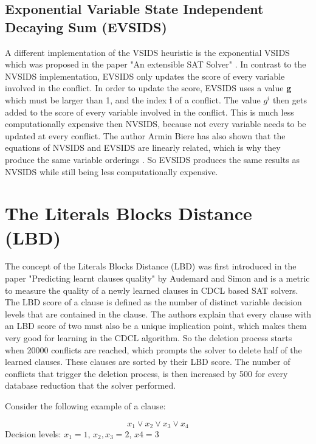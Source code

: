 \subsection{Exponential Variable State Independent Decaying Sum (EVSIDS)}

A different implementation of the VSIDS heuristic is the exponential VSIDS which was proposed in the paper "An extensible SAT Solver" \cite{een2003extensible}. In contrast to the NVSIDS implementation, EVSIDS only updates the score of every variable involved in the conflict. In order to update the score, EVSIDS uses a value \textbf{g} which must be larger than 1, and the index \textbf{i} of a conflict. The value $g^{i}$ then gets added to the score of every variable involved in the conflict. This is much less computationally expensive then NVSIDS, because not every variable needs to be updated at every conflict. The author Armin Biere has also shown that the equations of NVSIDS and EVSIDS are linearly related, which is why they produce the same variable orderings \cite{biere2008adaptive}. So EVSIDS produces the same results as NVSIDS while still being less computationally expensive.

\section{The Literals Blocks Distance (LBD)}

The concept of the Literals Blocks Distance (LBD) was first introduced in the paper "Predicting learnt clauses quality" \cite{audemard2009predicting} by Audemard and Simon and is a metric to measure the quality of a newly learned clauses in CDCL based SAT solvers. The LBD score of a clause is defined as the number of distinct variable decision levels that are contained in the clause. The authors explain that every clause with an LBD score of two must also be a unique implication point, which makes them very good for learning in the CDCL algorithm. So the deletion process starts when 20000 conflicts are reached, which prompts the solver to delete half of the learned clauses. These clauses are sorted by their LBD score. The number of conflicts that trigger the deletion process, is then increased by 500 for every database reduction that the solver performed.

Consider the following example of a clause:

\begin{leftbar}
\begin{center}
\begin{displaymath}
x_1 \vee x_2 \vee x_3 \vee x_4
\end{displaymath}
Decision levels: $x_1=1$, $x_2,x_3=2$, $x4=3$ 
\end{center}
\end{leftbar}

